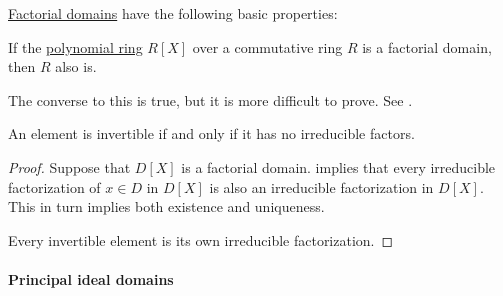 \begin{proposition}\label{thm:def:factorial_domain}
  \hyperref[def:factorial_domain]{Factorial domains} have the following basic properties:
  \begin{thmenum}
     If the \hyperref[def:polynomial_algebra]{polynomial ring} \( R[X] \) over a commutative ring \( R \) is a factorial domain, then \( R \) also is.

    The converse to this is true, but it is more difficult to prove. See .

     An element is invertible if and only if it has no irreducible factors.
  \end{thmenum}
\end{proposition}
\begin{proof}
   Suppose that \( D[X] \) is a factorial domain.  implies that every irreducible factorization of \( x \in D \) in \( D[X] \) is also an irreducible factorization in \( D[X] \). This in turn implies both existence and uniqueness.

   Every invertible element is its own irreducible factorization.
\end{proof}

\paragraph{Principal ideal domains}

